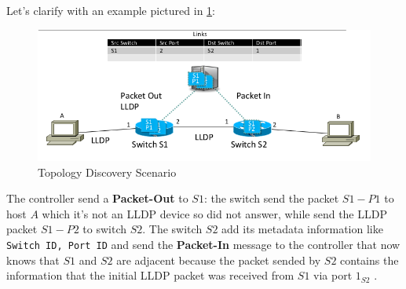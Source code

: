 \documentclass[10pt,a4paper]{report}
\theoremstyle{definition}
\begin{document}
Let's clarify with an example pictured in \ref{lldp-topology-discovery}:
\begin{figure}[h]
	\centering\includegraphics[scale=0.50]{images/Pasted image 20230330100743.png}
	\caption{Topology Discovery Scenario}
\label{lldp-topology-discovery}
\end{figure}

The controller send a \textbf{Packet-Out} to $S1$: the switch send the packet $S1-P1$ to host $A$ which it's not an LLDP device so did not answer, while send the LLDP packet $S1-P2$ to switch $S2$. The switch $S2$ add its metadata information like \texttt{Switch ID, Port ID} and send the \textbf{Packet-In} message to the controller that now knows that $S1$ and $S2$ are adjacent because the packet sended by $S2$ contains the information that the initial LLDP packet was received from $S1$ via port $1_{S2}$ .
\end{document}

